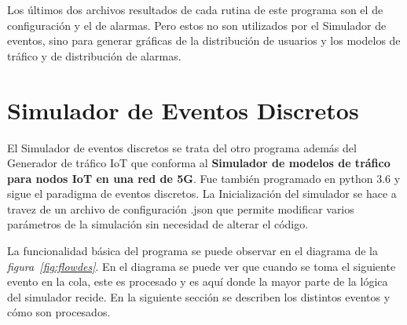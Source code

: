 Los últimos dos archivos resultados de cada rutina de este programa son el de configuración y el de alarmas. Pero estos no son utilizados por el Simulador de eventos, sino para generar gráficas de la distribución de usuarios y los modelos de tráfico y de distribución de alarmas.\newline

\hfill

\break



\section{Simulador de Eventos Discretos}

El Simulador de eventos discretos se trata del otro programa además del Generador de tráfico IoT que conforma al \textbf{Simulador de modelos de tráfico para nodos IoT en una red de 5G}. Fue también programado en python 3.6 y sigue el paradigma de eventos discretos. La Inicialización del simulador se hace a travez de un archivo de configuración .json que permite modificar varios parámetros de la simulación sin necesidad de alterar el código.\newline

La funcionalidad básica del programa se puede observar en el diagrama de la \textit{figura~\ref{fig:flowdes}}. En el diagrama se puede ver que cuando se toma el siguiente evento en la cola, este es procesado y es aquí donde la mayor parte de la lógica del simulador recide. En la siguiente sección se describen los distintos eventos y cómo son procesados.\newline

